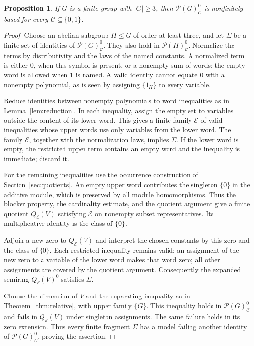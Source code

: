 \documentclass[11pt,reqno]{amsart}
\newtheorem{proposition}[theorem]{Proposition}
\theoremstyle{definition}
\numberwithin{equation}{section}
\newcommand{\Full}[1]{\mathcal{P}(#1)^0}
\newcommand{\calE}{\mathcal{E}}
\renewcommand{\leq}{\leqslant}
\renewcommand{\geq}{\geqslant}
\begin{document}
\begin{proposition}\label{prop:constants}
If $G$ is a finite group with $|G|\geq 3$, then $\Full{G}_{\mathscr C}$ is nonfinitely based for every $\mathscr C\subseteq\{0,1\}$.
\end{proposition}
\begin{proof}
Choose an abelian subgroup $H\leq G$ of order at least three, and let $\Sigma$ be a finite set of identities of $\Full{G}_{\mathscr C}$. They also hold in $\Full{H}_{\mathscr C}$. Normalize the terms by distributivity and the laws of the named constants. A normalized term is either $0$, when this symbol is present, or a nonempty sum of words; the empty word is allowed when $1$ is named. A valid identity cannot equate $0$ with a nonempty polynomial, as is seen by assigning $\{1_H\}$ to every variable.

Reduce identities between nonempty polynomials to word inequalities as in Lemma~\ref{lem:reduction}. In each inequality, assign the empty set to variables outside the content of its lower word. This gives a finite family $\calE$ of valid inequalities whose upper words use only variables from the lower word. The family $\calE$, together with the normalization laws, implies $\Sigma$. If the lower word is empty, the restricted upper term contains an empty word and the inequality is immediate; discard it.

For the remaining inequalities use the occurrence construction of Section~\ref{sec:quotients}. An empty upper word contributes the singleton $\{0\}$ in the additive module, which is preserved by all module homomorphisms. Thus the blocker property, the cardinality estimate, and the quotient argument give a finite quotient $Q_{\calE}(V)$ satisfying $\calE$ on nonempty subset representatives. Its multiplicative identity is the class of $\{0\}$.

Adjoin a new zero to $Q_{\calE}(V)$ and interpret the chosen constants by this zero and the class of $\{0\}$. Each restricted inequality remains valid: an assignment of the new zero to a variable of the lower word makes that word zero; all other assignments are covered by the quotient argument. Consequently the expanded semiring $Q_{\calE}(V)^0$ satisfies $\Sigma$.

Choose the dimension of $V$ and the separating inequality as in Theorem~\ref{thm:relative}, with upper family $\{G\}$. This inequality holds in $\Full{G}_{\mathscr C}$ and fails in $Q_{\calE}(V)$ under singleton assignments. The same failure holds in its zero extension. Thus every finite fragment $\Sigma$ has a model failing another identity of $\Full{G}_{\mathscr C}$, proving the assertion.
\end{proof}
\end{document}
